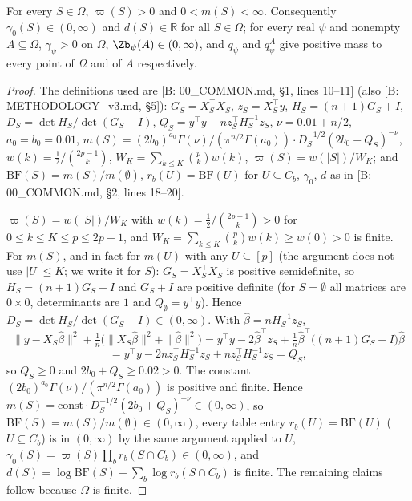 \documentclass[11pt]{report}
\begin{document}
\begin{T13lemma}[Positivity]\label{T13:lem:pos}
For every $S\in\Omega$, $\varpi(S)>0$ and $0<m(S)<\infty$. Consequently $\gamma_0(S)\in(0,\infty)$ and $d(S)\in\mathbb{R}$ for all $S\in\Omega$; for every real $\psi$ and nonempty $A\subseteq\Omega$, $\gamma_\psi>0$ on $\Omega$, $\Zb_\psi(A)\in(0,\infty)$, and $q_\psi$ and $q_\psi^A$ give positive mass to every point of $\Omega$ and of $A$ respectively.
\end{T13lemma}
\begin{proof}
The definitions used are [B: 00\_COMMON.md, \S1, lines 10--11] (also [B: METHODOLOGY\_v3.md, \S5]): $G_S=X_S^\top X_S$, $z_S=X_S^\top y$, $H_S=(n+1)G_S+I$, $D_S=\det H_S/\det(G_S+I)$, $Q_S=y^\top y-nz_S^\top H_S^{-1}z_S$, $\nu=0.01+n/2$, $a_0=b_0=0.01$,
$m(S)=(2b_0)^{a_0}\Gamma(\nu)/(\pi^{n/2}\Gamma(a_0))\cdot D_S^{-1/2}(2b_0+Q_S)^{-\nu}$, $w(k)=\tfrac12/\binom{2p-1}{k}$, $W_K=\sum_{k\le K}\binom pk w(k)$, $\varpi(S)=w(|S|)/W_K$; and $\mathrm{BF}(S)=m(S)/m(\emptyset)$, $r_b(U)=\mathrm{BF}(U)$ for $U\subseteq C_b$, $\gamma_0$, $d$ as in [B: 00\_COMMON.md, \S2, lines 18--20].

$\varpi(S)=w(|S|)/W_K$ with $w(k)=\tfrac12/\binom{2p-1}{k}>0$ for $0\le k\le K\le p\le 2p-1$, and $W_K=\sum_{k\le K}\binom pk w(k)\ge w(0)>0$ is finite.
For $m(S)$, and in fact for $m(U)$ with any $U\subseteq[p]$ (the argument does not use $|U|\le K$; we write it for $S$): $G_S=X_S^\top X_S$ is positive semidefinite, so $H_S=(n+1)G_S+I$ and $G_S+I$ are positive definite (for $S=\emptyset$ all matrices are $0\times 0$, determinants are $1$ and $Q_\emptyset=y^\top y$). Hence $D_S=\det H_S/\det(G_S+I)\in(0,\infty)$. With $\hat\beta=nH_S^{-1}z_S$,
\[
\|y-X_S\hat\beta\|^2+\tfrac1n\bigl(\|X_S\hat\beta\|^2+\|\hat\beta\|^2\bigr)
= y^\top y-2\hat\beta^\top z_S+\tfrac1n\hat\beta^\top\bigl((n+1)G_S+I\bigr)\hat\beta
\]\[
= y^\top y-2n z_S^\top H_S^{-1}z_S+n z_S^\top H_S^{-1}z_S=Q_S,
\]
so $Q_S\ge0$ and $2b_0+Q_S\ge 0.02>0$. The constant $(2b_0)^{a_0}\Gamma(\nu)/(\pi^{n/2}\Gamma(a_0))$ is positive and finite. Hence $m(S)=\text{const}\cdot D_S^{-1/2}(2b_0+Q_S)^{-\nu}\in(0,\infty)$, so $\mathrm{BF}(S)=m(S)/m(\emptyset)\in(0,\infty)$, every table entry $r_b(U)=\mathrm{BF}(U)$ ($U\subseteq C_b$) is in $(0,\infty)$ by the same argument applied to $U$, $\gamma_0(S)=\varpi(S)\prod_b r_b(S\cap C_b)\in(0,\infty)$, and $d(S)=\log\mathrm{BF}(S)-\sum_b\log r_b(S\cap C_b)$ is finite. The remaining claims follow because $\Omega$ is finite.
\end{proof}
\end{document}
